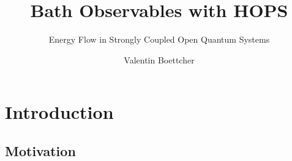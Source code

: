 \documentclass[10pt, aspectratio=169]{beamer}
\institute[TUD] %
{
  TU Dresden
}
\title{Bath Observables with HOPS}
\subtitle{Energy Flow in Strongly Coupled Open Quantum Systems}
\author{Valentin Boettcher}
\begin{document}
\hypersetup{pageanchor=false}
\maketitle

\hypersetup{pageanchor=true} 
\begin{frame}
  \tableofcontents
\end{frame}


\section{Introduction}
\label{sec:intro}

\subsection{Motivation}
\end{document}
